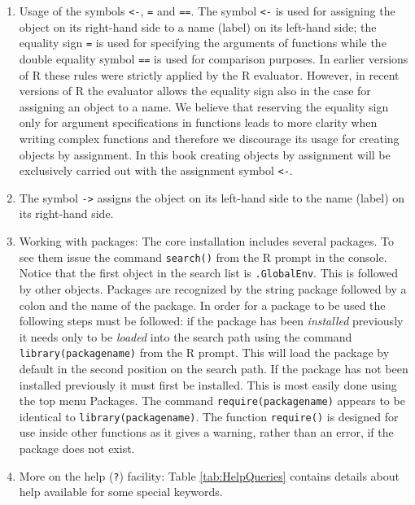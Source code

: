 \documentclass[
]{book}
\begin{document}
\begin{enumerate}
\def\labelenumi{(\alph{enumi})}
\setcounter{enumi}{5}
\item
  Usage of the symbols \texttt{\textless{}-}, \texttt{=} and \texttt{==}. The symbol \texttt{\textless{}-} is used for assigning the object on its right-hand side to a name (label) on its left-hand side; the equality sign \texttt{=} is used for specifying the arguments of functions while the double equality symbol \texttt{==} is used for comparison purposes. In earlier versions of R these rules were strictly applied by the R evaluator. However, in recent versions of R the evaluator allows the equality sign also in the case for assigning an object to a name. We believe that reserving the equality sign only for argument specifications in functions leads to more clarity when writing complex functions and therefore we discourage its usage for creating objects by assignment. In this book creating objects by assignment will be exclusively carried out with the assignment symbol \texttt{\textless{}-}.
\item
  The symbol \texttt{-\textgreater{}} assigns the object on its left-hand side to the name (label) on its right-hand side.
\item
  Working with packages: The core installation includes several packages. To see them issue the command \texttt{search()} from the R prompt in the console. Notice that the first object in the search list is \texttt{.GlobalEnv}. This is followed by other objects. Packages are recognized by the string package followed by a colon and the name of the package. In order for a package to be used the following steps must be followed: if the package has been \emph{{installed}} previously it needs only to be \emph{{loaded}} into the search path using the command \texttt{library(packagename)} from the R prompt. This will load the package by default in the second position on the search path. If the package has not been installed previously it must first be installed. This is most easily done using the top menu Packages. The command \texttt{require(packagename)} appears to be identical to \texttt{library(packagename)}. The function \texttt{require()} is designed for use inside other functions as it gives a warning, rather than an error, if the package does not exist.
\item
  More on the help (\texttt{?}) facility: Table \ref{tab:HelpQueries} contains details about help available for some special keywords.
\end{enumerate}
\end{document}
